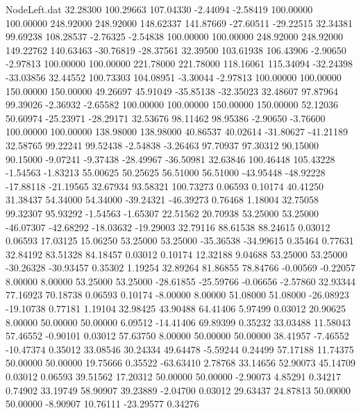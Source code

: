 \begin{filecontents}{NodeLeft.dat}
  32.28300  100.29663  107.04330    -2.44094   -2.58419  100.00000  100.00000  248.92000  248.92000  148.62337  141.87669  -27.60511  -29.22515
  32.34381   99.69238  108.28537    -2.76325   -2.54838  100.00000  100.00000  248.92000  248.92000  149.22762  140.63463  -30.76819  -28.37561
  32.39500  103.61938  106.43906    -2.90650   -2.97813  100.00000  100.00000  221.78000  221.78000  118.16061  115.34094  -32.24398  -33.03856
  32.44552  100.73303  104.08951    -3.30044   -2.97813  100.00000  100.00000  150.00000  150.00000   49.26697   45.91049  -35.85138  -32.35023
  32.48607   97.87964   99.39026    -2.36932   -2.65582  100.00000  100.00000  150.00000  150.00000   52.12036   50.60974  -25.23971  -28.29171
  32.53676   98.11462   98.95386    -2.90650   -3.76600  100.00000  100.00000  138.98000  138.98000   40.86537   40.02614  -31.80627  -41.21189
  32.58765   99.22241   99.52438    -2.54838   -3.26463   97.70937   97.30312   90.15000   90.15000   -9.07241   -9.37438  -28.49967  -36.50981
  32.63846  100.46448  105.43228    -1.54563   -1.83213   55.00625   50.25625   56.51000   56.51000  -43.95448  -48.92228  -17.88118  -21.19565
  32.67934   93.58321  100.73273     0.06593    0.10174   40.41250   31.38437   54.34000   54.34000  -39.24321  -46.39273    0.76468    1.18004
  32.75058   99.32307   95.93292    -1.54563   -1.65307   22.51562   20.70938   53.25000   53.25000  -46.07307  -42.68292  -18.03632  -19.29003
  32.79116   88.61538   88.24615     0.03012    0.06593   17.03125   15.06250   53.25000   53.25000  -35.36538  -34.99615    0.35464    0.77631
  32.84192   83.51328   84.18457     0.03012    0.10174   12.32188    9.04688   53.25000   53.25000  -30.26328  -30.93457    0.35302    1.19254
  32.89264   81.86855   78.84766    -0.00569   -0.22057    8.00000    8.00000   53.25000   53.25000  -28.61855  -25.59766   -0.06656   -2.57860
  32.93344   77.16923   70.18738     0.06593    0.10174   -8.00000    8.00000   51.08000   51.08000  -26.08923  -19.10738    0.77181    1.19104
  32.98425   43.90488   64.41406     5.97499    0.03012   20.90625    8.00000   50.00000   50.00000    6.09512  -14.41406   69.89399    0.35232
  33.03488   11.58043   57.46552    -0.90101    0.03012   57.63750    8.00000   50.00000   50.00000   38.41957   -7.46552  -10.47374    0.35012
  33.08546   30.24334   49.64478    -5.59244    0.24499   57.17188   11.74375   50.00000   50.00000   19.75666    0.35522  -63.63410    2.78768
  33.14656   52.90073   45.14709     0.03012    0.06593   39.51562   17.20312   50.00000   50.00000   -2.90073    4.85291    0.34217    0.74902
  33.19749   58.90907   39.23889    -2.04700    0.03012   29.63437   24.87813   50.00000   50.00000   -8.90907   10.76111  -23.29577    0.34276

\end{filecontents}
